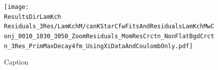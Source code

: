 \documentclass[../AnalysisNoteJBuxton.tex]{subfiles}
\begin{document}

\begin{figure}[h]
  \centering
  \texttt{[image: \\ResultsDirLamKch Residuals\_3Res/LamKchM/canKStarCfwFitsAndResidualsLamKchMwConj\_0010\_1030\_3050\_ZoomResiduals\_MomResCrctn\_NonFlatBgdCrctn\_3Res\_PrimMaxDecay4fm\_UsingXiDataAndCoulombOnly.pdf]}
  \caption[Small Caption]{Caption}
  \label{fig:LamKchMwConjFitsAndResiduals_3Res}
\end{figure}
\end{document}
